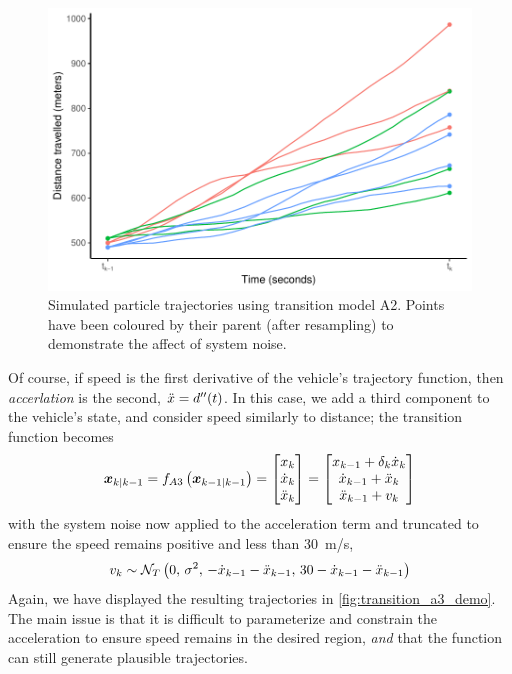 \begin{knitrout}\small
{}\color{fgcolor}\begin{figure}

{\centering \includegraphics[width=.8\textwidth]{figure/transition_a2_demo-1} 

}

\caption[Simulated particle trajectories using transition model A2]{Simulated particle trajectories using transition model A2. Points have been coloured by their parent (after resampling) to demonstrate the affect of system noise.}\label{fig:transition_a2_demo}
\end{figure}


\end{knitrout}


Of course, if speed is the first derivative of the vehicle's trajectory function, then \emph{accerlation} is the second, $\ddot x = d''(t)$. In this case, we add a third component to the vehicle's state, and consider speed similarly to distance; the transition function becomes
\begin{equation}
\label{eq:vehicle_model_newton_accel}
\boldsymbol x_{k|k-1} = f_{A3}\left(\boldsymbol x_{k-1|k-1}\right) =
\begin{bmatrix}
x_k \\ \dot x_k \\ \ddot x_k
\end{bmatrix} =
\begin{bmatrix}
x_{k-1} + \delta_k\dot x_k \\
\dot x_{k-1} + \ddot x_k \\
\ddot x_{k-1} + v_k
\end{bmatrix}
\end{equation}
with the system noise now applied to the acceleration term and truncated to ensure the speed remains positive and less than 30~m/s,
\begin{equation}
\label{eq:vehicle_model_accel_dist}
v_k \sim \mathcal{N}_T\left(0,\, \sigma^2,\, -\dot x_{k-1} - \ddot x_{k-1},\, 30 - \dot x_{k-1} - \ddot x_{k-1}\right)
\end{equation}
Again, we have displayed the resulting trajectories in \cref{fig:transition_a3_demo}. The main issue is that it is difficult to parameterize and constrain the acceleration to ensure speed remains in the desired region, \emph{and} that the function can still generate plausible trajectories.


